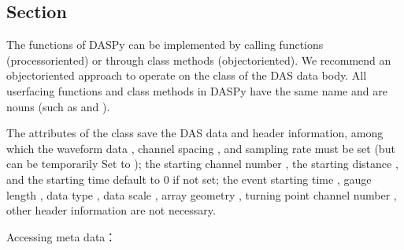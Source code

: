 \documentclass[letterpaper,10pt,english]{sphinxmanual}
\begin{document}
\subsection{Section}
\label{\detokenize{Reading DAS Data:section}}
\sphinxAtStartPar
The functions of DASPy can be implemented by calling functions (process\sphinxhyphen{}oriented) or through class methods (object\sphinxhyphen{}oriented). We recommend an object\sphinxhyphen{}oriented approach to operate on the  class of the DAS data body. All user\sphinxhyphen{}facing functions and class methods in DASPy have the same name and are nouns (such as  and ).

\sphinxAtStartPar
The attributes of the  class save the DAS data and header information, among which the waveform data , channel spacing , and sampling rate  must be set (but can be temporarily Set to  ); the starting channel number , the starting distance , and the starting time  default to 0 if not set; the event starting time , gauge length , data type , data scale , array geometry , turning point channel number , other header information  are not necessary.

\sphinxAtStartPar
Accessing meta data：

\begin{sphinxVerbatim}[commandchars=\\\{\}]
\end{sphinxVerbatim}
\end{document}
